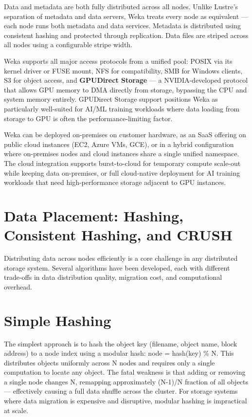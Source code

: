 Data and metadata are both fully distributed across all nodes. Unlike Lustre's separation of metadata and data servers, Weka treats every node as equivalent --- each node runs both metadata and data services. Metadata is distributed using consistent hashing and protected through replication. Data files are striped across all nodes using a configurable stripe width.

Weka supports all major access protocols from a unified pool: POSIX via its kernel driver or FUSE mount, NFS for compatibility, SMB for Windows clients, S3 for object access, and \textbf{GPUDirect Storage} --- a NVIDIA-developed protocol that allows GPU memory to DMA directly from storage, bypassing the CPU and system memory entirely. GPUDirect Storage support positions Weka as particularly well-suited for AI/ML training workloads where data loading from storage to GPU is often the performance-limiting factor.

Weka can be deployed on-premises on customer hardware, as an SaaS offering on public cloud instances (EC2, Azure VMs, GCE), or in a hybrid configuration where on-premises nodes and cloud instances share a single unified namespace. The cloud integration supports burst-to-cloud for temporary compute scale-out while keeping data on-premises, or full cloud-native deployment for AI training workloads that need high-performance storage adjacent to GPU instances.

\section{Data Placement: Hashing, Consistent Hashing, and CRUSH}
Distributing data across nodes efficiently is a core challenge in any distributed storage system. Several algorithms have been developed, each with different trade-offs in data distribution quality, migration cost, and computational overhead.

\section{Simple Hashing}
The simplest approach is to hash the object key (filename, object name, block address) to a node index using a modular hash: node = hash(key) \% N. This distributes objects uniformly across N nodes and requires only a single computation to locate any object. The fatal weakness is that adding or removing a single node changes N, remapping approximately (N-1)/N fraction of all objects --- effectively causing a full data shuffle across the cluster. For storage systems where data migration is expensive and disruptive, modular hashing is impractical at scale.

